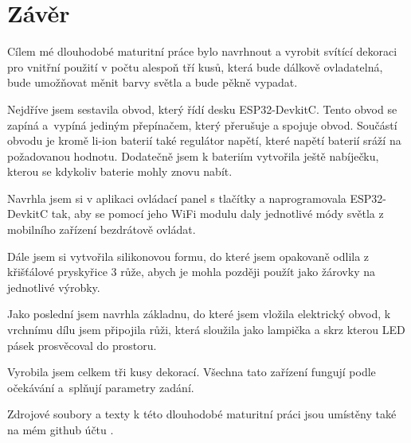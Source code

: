 \chapter{Závěr}
Cílem mé dlouhodobé maturitní práce bylo  navrhnout a vyrobit svítící dekoraci pro vnitřní použití 
v počtu
alespoň tří kusů, která bude dálkově ovladatelná, bude umožňovat
měnit barvy světla
a bude pěkně vypadat.

Nejdříve jsem sestavila obvod, který řídí desku ESP32-DevkitC. Tento obvod se zapíná a~vypíná jediným přepínačem, který přerušuje a spojuje obvod. Součástí obvodu je kromě li-ion baterií také regulátor napětí, které napětí baterií sráží na požadovanou hodnotu. Dodatečně jsem k bateriím vytvořila ještě nabíječku, kterou se kdykoliv baterie mohly znovu nabít. 

Navrhla jsem si v aplikaci ovládací panel s tlačítky a naprogramovala ESP32-DevkitC tak, aby se pomocí jeho WiFi modulu daly jednotlivé módy světla z mobilního zařízení bezdrátově ovládat.  

Dále jsem si vytvořila silikonovou formu, do které jsem opakovaně odlila z křišťálové pryskyřice 3 růže, abych je mohla později použít jako žárovky na jednotlivé výrobky. 

Jako poslední jsem navrhla základnu, do které jsem vložila elektrický obvod, k vrchnímu dílu jsem připojila růži, která sloužila jako lampička a skrz kterou LED pásek prosvěcoval do prostoru. 

Vyrobila jsem celkem tři kusy dekorací. Všechna tato zařízení fungují podle očekávání a~splňují parametry zadání. 

Zdrojové soubory a texty k této dlouhodobé maturitní práci jsou umístěny také na mém github účtu \cite{github}.








 

